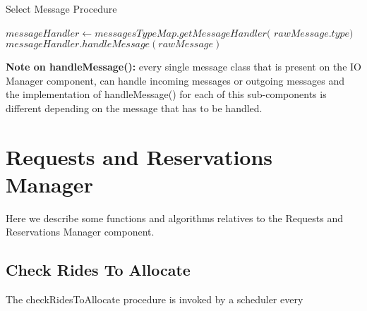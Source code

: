 \documentclass[../../dd.tex]{subfiles}
\begin{document}
				\begin{algorithm}
					\caption{Select Message Procedure}\label{alg:selectMessage}
					\begin{algorithmic}[1]
						\State $messageHandler\gets messagesTypeMap.getMessageHandler($
						\State $rawMessage.type)$
						\State $messageHandler.handleMessage(rawMessage)$
					\EndProcedure
					\end{algorithmic}
				\end{algorithm}

				\textbf{Note on handleMessage():} every single message class that is present on the IO Manager component, can handle incoming messages or outgoing messages and the implementation of handleMessage() for each of this sub-components is different depending on the message that has to be handled.

		\section{Requests and Reservations Manager}
			Here we describe some functions and algorithms relatives to the Requests and Reservations Manager component.
			\subsection{Check Rides To Allocate}
				The checkRidesToAllocate procedure is invoked by a scheduler every 
\end{document}
